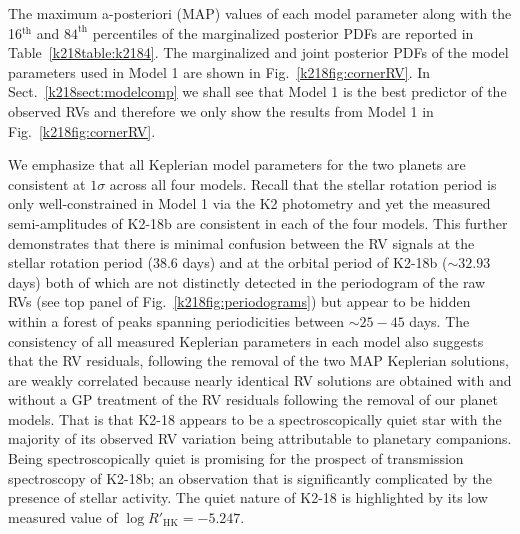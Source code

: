 The maximum a-posteriori (MAP) values of each model parameter along with the 16$^{\text{th}}$
and $84^{\text{th}}$ percentiles of
the marginalized posterior PDFs are reported in Table~\ref{k218table:k2184}. The marginalized and joint posterior
PDFs of the model parameters used in Model 1 are shown in Fig.~\ref{k218fig:cornerRV}. In Sect.~\ref{k218sect:modelcomp}
we shall see that Model 1 is the best predictor of the observed RVs and therefore we only show the results from
Model 1 in Fig.~\ref{k218fig:cornerRV}.

We emphasize that all Keplerian 
model parameters for the two planets are consistent at $1\sigma$ across all four models. Recall that the stellar
rotation period is only well-constrained in Model 1 via the K2 photometry and yet the measured semi-amplitudes of
K2-18b are consistent in each of the four models. This further demonstrates that there is minimal confusion between
the RV signals at the stellar rotation period (38.6 days) and at the orbital period of K2-18b ($\sim 32.93$ days)
both of which are not distinctly detected in the periodogram of the raw RVs (see top panel of Fig.~\ref{k218fig:periodograms})
but appear to be hidden within a forest of peaks spanning periodicities between $\sim 25-45$ days. 
The consistency of all measured Keplerian parameters in each model also suggests that the RV residuals,
following the removal of the two MAP Keplerian solutions, are weakly correlated because nearly identical RV solutions
are obtained with and without a GP treatment of the RV residuals following the removal of our planet models.
That is that K2-18 appears to be a spectroscopically quiet star with the majority of its observed RV variation being
attributable to planetary companions. Being spectroscopically quiet is promising for the prospect of
transmission spectroscopy of K2-18b; an observation that is significantly complicated by the presence of
stellar activity. The quiet nature of K2-18 is highlighted by its low measured value of $\log{R'_{\text{HK}}}=-5.247$.  


